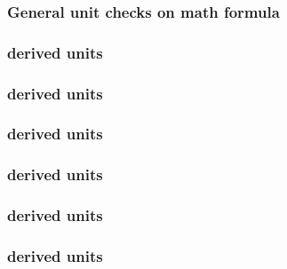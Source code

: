 \subsubsection*{General unit checks on math formula} \begin{sbmlenum}


\end{sbmlenum} \subsubsection*{ derived units} \begin{sbmlenum}


\end{sbmlenum} \subsubsection*{ derived units} \begin{sbmlenum}

\end{sbmlenum} \subsubsection*{ derived units} \begin{sbmlenum}

\end{sbmlenum} \subsubsection*{ derived units} \begin{sbmlenum}


\end{sbmlenum} \subsubsection*{ derived units} \begin{sbmlenum}


\end{sbmlenum} \subsubsection*{ derived units} \begin{sbmlenum}


\end{sbmlenum}


